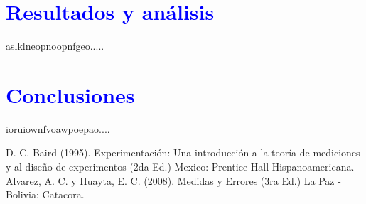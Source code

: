 \documentclass[11pt]{article}
\begin{document}
\begin{multicols}{2}
\section{\textbf{\textcolor{blue}{Resultados y análisis}}}
\noindent aslklneopnoopnfgeo.....
\section{\textbf{\textcolor{blue}{Conclusiones}}}
\noindent ioruiownfvoawpoepao....
\begin{thebibliography}{10}
 D. C. Baird (1995). Experimentación: Una introducción a la teoría de mediciones y al diseño de experimentos (2da Ed.) Mexico: Prentice-Hall Hispanoamericana.
 Alvarez, A. C. y Huayta, E. C. (2008). Medidas y Errores (3ra Ed.) La Paz - Bolivia: Catacora.
\end{thebibliography}
\end{multicols}
\end{document}
